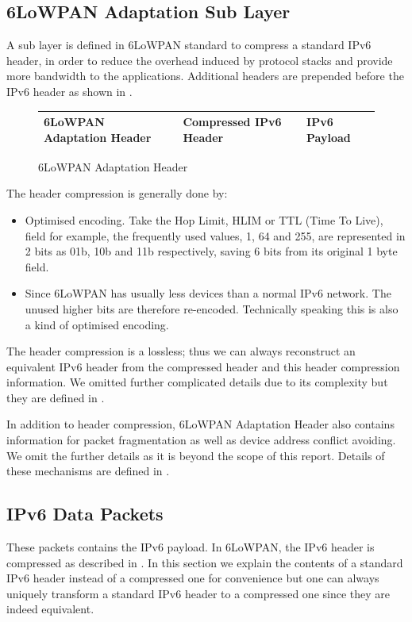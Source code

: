\subsection{6LoWPAN Adaptation Sub Layer} \label{Subsec:6LoWPAN Adaptation Sub Layer}
A sub layer is defined in 6LoWPAN standard\cite{rfc4944} to compress a standard IPv6 header, in order to reduce the overhead induced by protocol stacks and provide more bandwidth to the applications. Additional headers are prepended before the IPv6 header as shown in . 

\begin{figure}[h!]
	\centering
	\begin{tabular}{|l|l|l|}
		\hline
		6LoWPAN Adaptation Header & Compressed IPv6 Header & IPv6 Payload \\ \hline
	\end{tabular}
	\caption{6LoWPAN Adaptation Header}
\label{Fig: 6LoWPAN Adaptation Header}
\end{figure}

The header compression is generally done by:
\begin{itemize}
	\item Optimised encoding. Take the Hop Limit, HLIM or TTL (Time To Live), field for example, the frequently used values, 1, 64 and 255, are represented in 2 bits as 01b, 10b and 11b respectively, saving 6 bits from its original 1 byte field.
	\item Since 6LoWPAN has usually less devices than a normal IPv6 network. The unused higher bits are therefore re-encoded. Technically speaking this is also a kind of optimised encoding.
\end{itemize}
The header compression is a lossless; thus we can always reconstruct an equivalent IPv6 header from the compressed header and this header compression information. We omitted further complicated details due to its complexity but they are defined in \cite{rfc6282}.

In addition to header compression, 6LoWPAN Adaptation Header also contains information for packet fragmentation as well as device address conflict avoiding. We omit the further details as it is beyond the scope of this report. Details of these mechanisms are defined in \cite{rfc4944}.

\subsection{IPv6 Data Packets} \label{Subsec: IPv6 Data Packets}
These packets contains the IPv6 payload. In 6LoWPAN, the IPv6 header is compressed as described in . In this section we explain the contents of a standard IPv6 header instead of a compressed one for convenience but one can always uniquely transform a standard IPv6 header to a compressed one since they are indeed equivalent.

